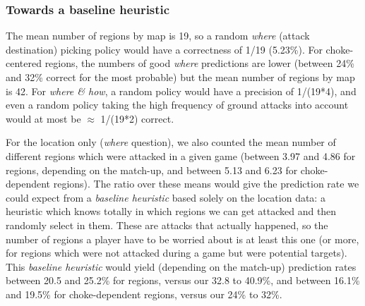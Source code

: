 \subsubsection{Towards a baseline heuristic}

 The mean number of regions by map is 19, so a random \textit{where} (attack destination) picking policy would have a correctness of 1/19 (5.23\%). For choke-centered regions, the numbers of good \textit{where} predictions are lower (between 24\% and 32\% correct for the most probable) but the mean number of regions by map is 42. For \textit{where \& how}, a random policy would have a precision of 1/(19*4), and even a random policy taking the high frequency of ground attacks into account would at most be $\approx$ 1/(19*2) correct. 


For the location only (\textit{where} question), we also counted the mean number of different regions which were attacked in a given game (between 3.97 and 4.86 for regions, depending on the match-up, and between 5.13 and 6.23 for choke-dependent regions). The ratio over these means would give the prediction rate we could expect from a \textit{baseline heuristic} based solely on the location data: a heuristic which knows totally in which regions we can get attacked and then randomly select in them. These are attacks that actually happened, so the number of regions a player have to be worried about is at least this one (or more, for regions which were not attacked during a game but were potential targets). This \textit{baseline heuristic} would yield (depending on the match-up) prediction rates between 20.5 and 25.2\% for regions, versus our 32.8 to 40.9\%, and between 16.1\% and 19.5\% for choke-dependent regions, versus our 24\% to 32\%.


